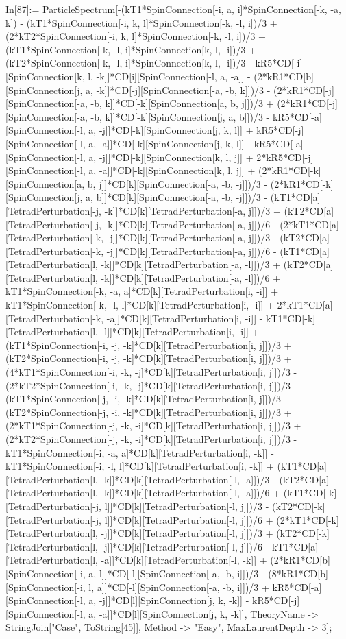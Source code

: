 In[87]:= ParticleSpectrum[-(kT1*SpinConnection[-i, a, i]*SpinConnection[-k, -a, k]) - (kT1*SpinConnection[-i, k, l]*SpinConnection[-k, -l, i])/3 + (2*kT2*SpinConnection[-i, k, l]*SpinConnection[-k, -l, i])/3 + (kT1*SpinConnection[-k, -l, i]*SpinConnection[k, l, -i])/3 + (kT2*SpinConnection[-k, -l, i]*SpinConnection[k, l, -i])/3 - kR5*CD[-i][SpinConnection[k, l, -k]]*CD[i][SpinConnection[-l, a, -a]] - (2*kR1*CD[b][SpinConnection[j, a, -k]]*CD[-j][SpinConnection[-a, -b, k]])/3 - (2*kR1*CD[-j][SpinConnection[-a, -b, k]]*CD[-k][SpinConnection[a, b, j]])/3 + (2*kR1*CD[-j][SpinConnection[-a, -b, k]]*CD[-k][SpinConnection[j, a, b]])/3 - kR5*CD[-a][SpinConnection[-l, a, -j]]*CD[-k][SpinConnection[j, k, l]] + kR5*CD[-j][SpinConnection[-l, a, -a]]*CD[-k][SpinConnection[j, k, l]] - kR5*CD[-a][SpinConnection[-l, a, -j]]*CD[-k][SpinConnection[k, l, j]] + 2*kR5*CD[-j][SpinConnection[-l, a, -a]]*CD[-k][SpinConnection[k, l, j]] + (2*kR1*CD[-k][SpinConnection[a, b, j]]*CD[k][SpinConnection[-a, -b, -j]])/3 - (2*kR1*CD[-k][SpinConnection[j, a, b]]*CD[k][SpinConnection[-a, -b, -j]])/3 - (kT1*CD[a][TetradPerturbation[-j, -k]]*CD[k][TetradPerturbation[-a, j]])/3 + (kT2*CD[a][TetradPerturbation[-j, -k]]*CD[k][TetradPerturbation[-a, j]])/6 - (2*kT1*CD[a][TetradPerturbation[-k, -j]]*CD[k][TetradPerturbation[-a, j]])/3 - (kT2*CD[a][TetradPerturbation[-k, -j]]*CD[k][TetradPerturbation[-a, j]])/6 - (kT1*CD[a][TetradPerturbation[l, -k]]*CD[k][TetradPerturbation[-a, -l]])/3 + (kT2*CD[a][TetradPerturbation[l, -k]]*CD[k][TetradPerturbation[-a, -l]])/6 + kT1*SpinConnection[-k, -a, a]*CD[k][TetradPerturbation[i, -i]] + kT1*SpinConnection[-k, -l, l]*CD[k][TetradPerturbation[i, -i]] + 2*kT1*CD[a][TetradPerturbation[-k, -a]]*CD[k][TetradPerturbation[i, -i]] - kT1*CD[-k][TetradPerturbation[l, -l]]*CD[k][TetradPerturbation[i, -i]] + (kT1*SpinConnection[-i, -j, -k]*CD[k][TetradPerturbation[i, j]])/3 + (kT2*SpinConnection[-i, -j, -k]*CD[k][TetradPerturbation[i, j]])/3 + (4*kT1*SpinConnection[-i, -k, -j]*CD[k][TetradPerturbation[i, j]])/3 - (2*kT2*SpinConnection[-i, -k, -j]*CD[k][TetradPerturbation[i, j]])/3 - (kT1*SpinConnection[-j, -i, -k]*CD[k][TetradPerturbation[i, j]])/3 - (kT2*SpinConnection[-j, -i, -k]*CD[k][TetradPerturbation[i, j]])/3 + (2*kT1*SpinConnection[-j, -k, -i]*CD[k][TetradPerturbation[i, j]])/3 + (2*kT2*SpinConnection[-j, -k, -i]*CD[k][TetradPerturbation[i, j]])/3 - kT1*SpinConnection[-i, -a, a]*CD[k][TetradPerturbation[i, -k]] - kT1*SpinConnection[-i, -l, l]*CD[k][TetradPerturbation[i, -k]] + (kT1*CD[a][TetradPerturbation[l, -k]]*CD[k][TetradPerturbation[-l, -a]])/3 - (kT2*CD[a][TetradPerturbation[l, -k]]*CD[k][TetradPerturbation[-l, -a]])/6 + (kT1*CD[-k][TetradPerturbation[-j, l]]*CD[k][TetradPerturbation[-l, j]])/3 - (kT2*CD[-k][TetradPerturbation[-j, l]]*CD[k][TetradPerturbation[-l, j]])/6 + (2*kT1*CD[-k][TetradPerturbation[l, -j]]*CD[k][TetradPerturbation[-l, j]])/3 + (kT2*CD[-k][TetradPerturbation[l, -j]]*CD[k][TetradPerturbation[-l, j]])/6 - kT1*CD[a][TetradPerturbation[l, -a]]*CD[k][TetradPerturbation[-l, -k]] + (2*kR1*CD[b][SpinConnection[-i, a, l]]*CD[-l][SpinConnection[-a, -b, i]])/3 - (8*kR1*CD[b][SpinConnection[-i, l, a]]*CD[-l][SpinConnection[-a, -b, i]])/3 + kR5*CD[-a][SpinConnection[-l, a, -j]]*CD[l][SpinConnection[j, k, -k]] - kR5*CD[-j][SpinConnection[-l, a, -a]]*CD[l][SpinConnection[j, k, -k]], TheoryName -> StringJoin["Case", ToString[45]], Method -> "Easy", MaxLaurentDepth -> 3]; 